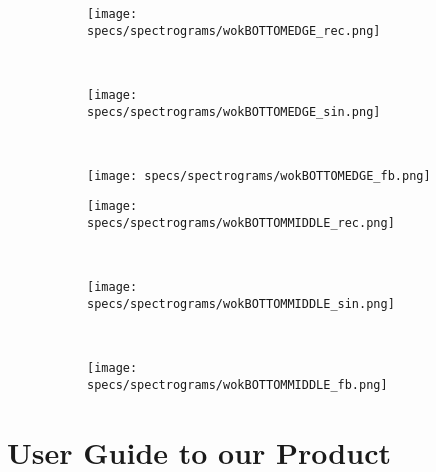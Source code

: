 \begin{figure}[H]
    \begin{subfigure}[b]{0.25\textwidth}
        \texttt{[image: specs/spectrograms/wokBOTTOMEDGE\_rec.png]}
    \end{subfigure}%
    ~ %
    \begin{subfigure}[b]{0.25\textwidth}
        \texttt{[image: specs/spectrograms/wokBOTTOMEDGE\_sin.png]}
    \end{subfigure}%
     ~ %
    \begin{subfigure}[b]{0.25\textwidth}
        \texttt{[image: specs/spectrograms/wokBOTTOMEDGE\_fb.png]}
    \end{subfigure}%
      
    \begin{subfigure}[b]{0.25\textwidth}
        \texttt{[image: specs/spectrograms/wokBOTTOMMIDDLE\_rec.png]}
    \end{subfigure}%
    ~ %
    \begin{subfigure}[b]{0.25\textwidth}
        \texttt{[image: specs/spectrograms/wokBOTTOMMIDDLE\_sin.png]}
    \end{subfigure}%
    ~ %
    \begin{subfigure}[b]{0.25\textwidth}
        \texttt{[image: specs/spectrograms/wokBOTTOMMIDDLE\_fb.png]}
    \end{subfigure}%
\end{figure}


\chapter{User Guide to our Product}\label{ap:guide}

